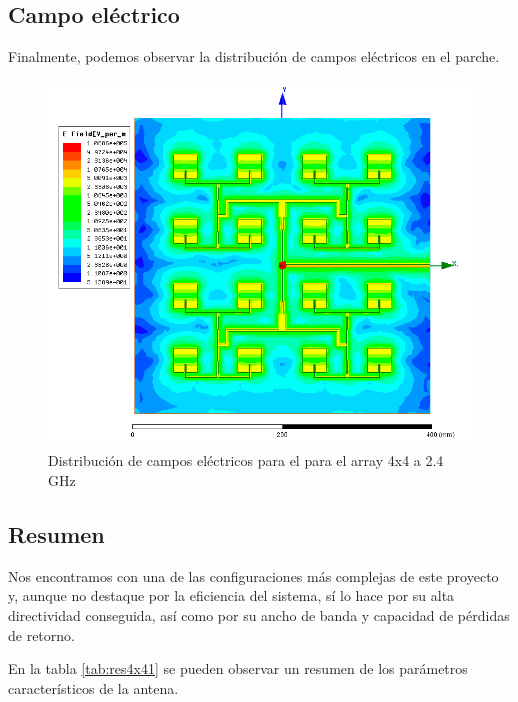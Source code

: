 \subsection{Campo eléctrico}
\par Finalmente, podemos observar la distribución de campos eléctricos en el parche. 

\begin{figure}[H]
    \centering
        \includegraphics[width=\textwidth]{archivos/analisis/4x41/8}
        \caption{Distribución de campos eléctricos para el para el array 4x4 a 2.4 GHz}
        \label{fig:elec4x41}
\end{figure}

\subsection{Resumen}
\par Nos encontramos con una de las configuraciones más complejas de este proyecto y, aunque no destaque por la eficiencia del sistema, sí lo hace por su alta directividad conseguida, así como por su ancho de banda y capacidad de pérdidas de retorno.
\\
\par En la tabla \ref{tab:res4x41} se pueden observar un resumen de los parámetros característicos de la antena.

